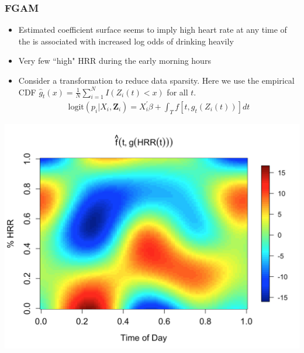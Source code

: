 \documentclass[10pt]{beamer}\usepackage[]{graphicx}\usepackage[]{color}
\begin{document}
\begin{frame}
\frametitle{FGAM}
\begin{itemize}
\item Estimated coefficient surface seems to imply high heart rate at any time of the is associated with increased log odds of drinking heavily
\item Very few ``high" HRR during the early morning hours
\item Consider a transformation to reduce data sparsity. Here we use the empirical CDF $\hat{g}_t(x) = \frac{1}{N}\sum_{i=1}^N I(Z_i(t) < x)$ for all $t$.
    \begin{align*}
    \text{logit}(p_i|X_i,\mathbf{Z}_i) = X_i^\prime\beta + \int_T f[t,g_t(Z_i(t))]dt
    \end{align*}
\end{itemize}
\end{frame}


\begin{frame}
\includegraphics[height=\textheight]{fgam_hrr_q}
\end{frame}
\end{document}
